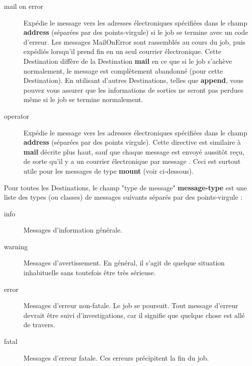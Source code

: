 \begin{description}
\begin{description}
\item [mail on error]
   Exp\'edie le message vers les adresses \'electroniques
   sp\'ecifi\'ees dans le champ {\bf address} (s\'epar\'ees par des points-virgule) 
   si le job se termine avec un code d'erreur. Les messages MailOnError sont 
   rassembl\'es au cours du job, puis exp\'edi\'es lorsqu'il prend fin en un seul 
   courrier \'electronique. Cette Destination diff\`ere de la Destination  {\bf mail} 
   en ce que si le job s'ach\`eve normalement, le message est compl\`etement 
   abandonn\'e (pour cette Destination). En utilisant d'autres Destinations, telles 
   que {\bf append}, vous pouvez vous assurer que les informations de sorties 
   ne seront pas perdues m\^eme si le job se termine normalement.

\item [operator]
   Exp\'edie le message vers les adresses \'electroniques
   sp\'ecifi\'ees dans le champ {\bf address} (s\'epar\'ees par des points virgule). 
   Cette directive est similaire \`a {\bf mail} d\'ecrite plus haut, sauf que 
   chaque message est envoy\'e aussit\^ot re\c{c}u, de sorte qu'il y a un courrier 
   \'electronique par message . Ceci est surtout utile pour les messages de 
   type {\bf mount} (voir ci-dessous).

\end{description}
  Pour toutes les Destinations, le champ "type de message" {\bf message-type}  est 
  une liste des types (ou classes) de messages  suivants s\'epar\'es par des 
  points-virgule :

\begin{description}

\item [info]
   Messages d'information g\'en\'erale.

\item [warning]
   Messages d'avertissement. En g\'en\'eral, il s'agit de quelque situation inhabituelle 
   sans toutefois \^etre tr\`es s\'erieuse.

\item [error]
   Messages d'erreur non-fatale. Le job se poursuit. Tout message d'erreur devrait 
   \^etre suivi d'investigations, car il signifie que quelque chose est all\'e de travers.

\item [fatal]
   Messages d'erreur fatale. Ces erreurs pr\'ecipitent la fin du job.


\end{description}
\end{description}
